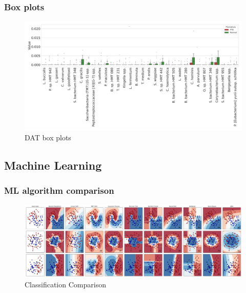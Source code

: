 \documentclass{beamer}
\begin{document}
    \begin{frame}
        \frametitle{Box plots}

        \begin{figure}
            \includegraphics[width=0.9 \linewidth]{figures/Step44/singleton.DADA2.homd.uncorrected.Mouth.box.pdf}
            \caption{DAT box plots}
        \end{figure}
    \end{frame}

    \subsection{Machine Learning}
    \begin{frame}
        \frametitle{ML algorithm comparison}

        \begin{figure}
            \includegraphics[width=\linewidth]{figures/ML.png}
            \caption{Classification Comparison \protect\cite{sklearn1}}
        \end{figure}
    \end{frame}
\end{document}
